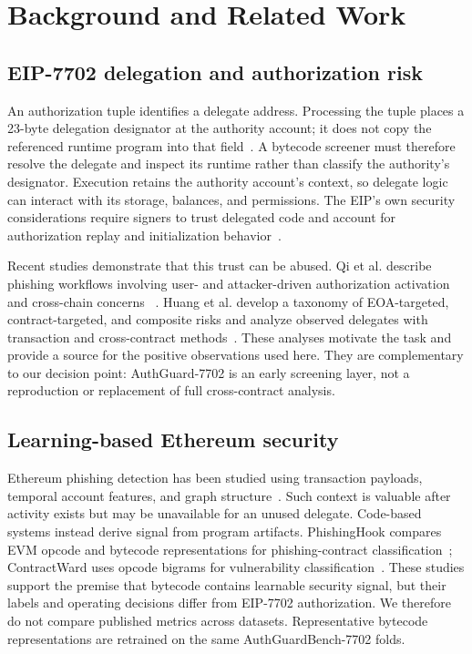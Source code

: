 \documentclass[conference]{IEEEtran}
\newcommand{\system}{AuthGuard-7702}
\newcommand{\bench}{AuthGuardBench-7702}
\begin{document}
\section{Background and Related Work}
\label{sec:related}

\subsection{EIP-7702 delegation and authorization risk}

An authorization tuple identifies a delegate address. Processing the tuple places a 23-byte
delegation designator at the authority account; it does not copy the referenced runtime program
into that field~\cite{eip7702}. A bytecode screener must therefore resolve the delegate and inspect
its runtime rather than classify the authority's designator. Execution retains the authority
account's context, so delegate logic can interact with its storage, balances, and permissions.
The EIP's own security considerations require signers to trust delegated code and account for
authorization replay and initialization behavior~\cite{eip7702}.

Recent studies demonstrate that this trust can be abused. Qi et al. describe phishing workflows
involving user- and attacker-driven authorization activation and cross-chain concerns
~\cite{qi2025eip7702phishing}. Huang et al. develop a taxonomy of EOA-targeted,
contract-targeted, and composite risks and analyze observed delegates with transaction and
cross-contract methods~\cite{huang2026darkside}. These analyses motivate the task and provide a
source for the positive observations used here. They are complementary to our decision point:
\system{} is an early screening layer, not a reproduction or replacement of full cross-contract
analysis.

\subsection{Learning-based Ethereum security}

Ethereum phishing detection has been studied using transaction payloads, temporal account
features, and graph structure~\cite{chen2025ptxphish,chen2020ijcai,chen2020toit}. Such context is
valuable after activity exists but may be unavailable for an unused delegate. Code-based systems
instead derive signal from program artifacts. PhishingHook compares EVM opcode and bytecode
representations for phishing-contract classification~\cite{derosa2025phishinghook}; ContractWard
uses opcode bigrams for vulnerability classification~\cite{wang2021contractward}. These studies
support the premise that bytecode contains learnable security signal, but their labels and
operating decisions differ from EIP-7702 authorization. We therefore do not compare published
metrics across datasets. Representative bytecode representations are retrained on the same
\bench{} folds.
\end{document}
